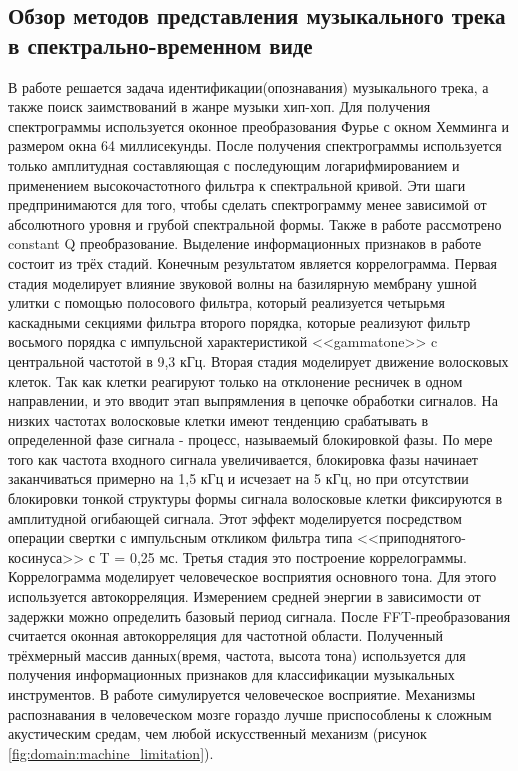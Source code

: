 \subsection{Обзор методов представления музыкального трека в спектрально-временном виде}
\label{sub:domain:overview_spectre}
В работе\cite{src3} решается задача идентификации(опознавания) музыкального трека, а также поиск заимствований в жанре музыки хип-хоп.  Для получения спектрограммы используется оконное преобразования Фурье с окном Хемминга и размером окна 64 миллисекунды. После получения спектрограммы используется только амплитудная составляющая с последующим логарифмированием и применением высокочастотного фильтра к спектральной кривой. Эти шаги предпринимаются для того, чтобы сделать спектрограмму менее зависимой от абсолютного уровня и грубой спектральной формы. Также в работе рассмотрено constant Q преобразование\cite{qtransform}. Выделение информационных признаков в  работе состоит из трёх стадий. Конечным результатом является коррелограмма. Первая стадия моделирует влияние  звуковой волны на базилярную мембрану ушной улитки с помощью полосового фильтра, который реализуется четырьмя каскадными секциями фильтра второго порядка, которые реализуют фильтр восьмого порядка с импульсной характеристикой <<gammatone>> c центральной частотой в 9,3 кГц. Вторая стадия моделирует движение  волосковых клеток. Так как клетки реагируют только на отклонение ресничек в одном направлении, и это вводит этап выпрямления в цепочке обработки сигналов. На низких частотах волосковые клетки имеют тенденцию срабатывать в определенной фазе сигнала - процесс, называемый блокировкой фазы. По мере того как частота входного сигнала увеличивается, блокировка фазы начинает заканчиваться примерно на 1,5 кГц и исчезает на 5 кГц, но при отсутствии блокировки тонкой структуры формы сигнала волосковые клетки фиксируются в амплитудной огибающей сигнала. Этот эффект моделируется посредством операции свертки с импульсным откликом фильтра типа <<приподнятого-косинуса>> \cite{raised_consinus} с T = 0,25 мс. Третья стадия это построение коррелограммы. Коррелограмма моделирует человеческое восприятия основного тона. Для этого используется автокорреляция.  Измерением средней энергии в зависимости от задержки можно определить базовый период сигнала. После FFT-преобразования считается оконная автокорреляция для частотной области. Полученный трёхмерный массив данных(время, частота, высота тона) используется для получения информационных признаков для классификации музыкальных инструментов. 
В работе симулируется человеческое восприятие. Механизмы распознавания в человеческом мозге гораздо лучше приспособлены к сложным акустическим средам, чем любой искусственный механизм (рисунок \ref{fig:domain:machine_limitation}). 

